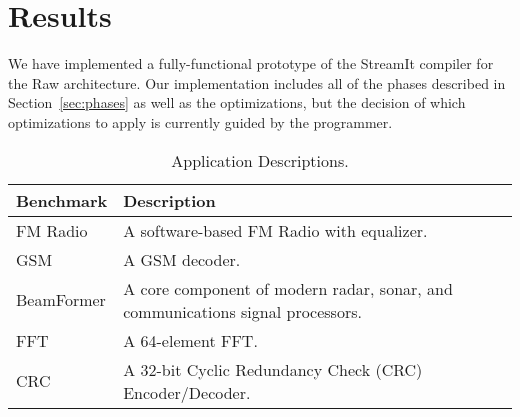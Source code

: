 \section{Results}
\label{sec:results}

We have implemented a fully-functional prototype of the StreamIt
compiler for the Raw architecture.  Our implementation includes all of
the phases described in Section~\ref{sec:phases} as well as the
optimizations, but the decision of which optimizations to apply is
currently guided by the programmer.

\begin{table}[t]
\begin{center}
\scriptsize
\begin{tabular}{|l|l|} \hline
{\bf Benchmark} & {\bf Description}\\
\hline \hline
FM Radio & A software-based FM Radio with equalizer.\\
\hline
GSM & A GSM decoder.\\
\hline
BeamFormer & A core component of modern radar, sonar, and communications signal processors. \cite{pca}\\
\hline
FFT & A 64-element FFT. \\
\hline
CRC & A 32-bit Cyclic Redundancy Check (CRC) Encoder/Decoder. \\
\hline
\end{tabular}
\vspace{-6pt}
\caption{\protect\small Application Descriptions.}
\label{tab:benchmarks}
\vspace{-12pt}
\end{center}
\end{table}

%
%
%


